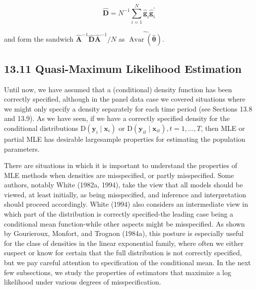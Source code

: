 \documentclass[10pt]{article}
\begin{document}
\begin{equation*}
\hat{\mathbf{D}}=N^{-1} \sum_{i=1}^{N} \hat{\mathbf{g}}_{i} \hat{\mathbf{g}}_{i}^{\prime} \tag{13.70}
\end{equation*}


and form the sandwich $\hat{\mathbf{A}}^{-1} \hat{\mathbf{D}} \hat{\mathbf{A}}^{-1} / N$ as $\widehat{\operatorname{Avar}(\hat{\boldsymbol{\theta}})}$.

\subsection*{13.11 Quasi-Maximum Likelihood Estimation}
Until now, we have assumed that a (conditional) density function has been correctly specified, although in the panel data case we covered situations where we might only specify a density separately for each time period (see Sections 13.8 and 13.9). As we have seen, if we have a correctly specified density for the conditional distributions $\mathrm{D}\left(\mathbf{y}_{i} \mid \mathbf{x}_{i}\right)$ or $\mathrm{D}\left(\mathbf{y}_{i t} \mid \mathbf{x}_{i t}\right), t=1, \ldots, T$, then MLE or partial MLE has desirable largesample properties for estimating the population parameters.

There are situations in which it is important to understand the properties of MLE methods when densities are misspecified, or partly misspecified. Some authors, notably White (1982a, 1994), take the view that all models should be viewed, at least initially, as being misspecified, and inference and interpretation should proceed accordingly. White (1994) also considers an intermediate view in which part of the distribution is correctly specified-the leading case being a conditional mean function-while other aspects might be misspecified. As shown by Gourieroux, Monfort, and Trognon (1984a), this posture is especially useful for the class of densities in the linear exponential family, where often we either suspect or know for certain that the full distribution is not correctly specified, but we pay careful attention to specification of the conditional mean. In the next few subsections, we study the properties of estimators that maximize a log likelihood under various degrees of misspecification.
\end{document}
